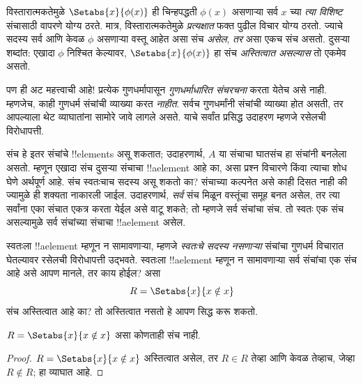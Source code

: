 \documentclass[../../../include/open-logic-section]{subfiles}
\begin{document}

विस्तारात्मकतेमुळे $\Setabs{x}{\phi(x)}$ ही चिन्हपद्धती $\phi(x)$ असणाऱ्या
सर्व $x$ च्या \emph{त्या विशिष्ट} संचासाठी वापरणे योग्य ठरते.
मात्र, विस्तारात्मकतेमुळे \emph{प्रत्यक्षात} फक्त पुढील विचार योग्य ठरतो.
ज्याचे सदस्य सर्व आणि केवळ $\phi$ असणाऱ्या वस्तू आहेत असा संच \emph{असेल},
\emph{तर} असा एकच संच असतो. दुसऱ्या शब्दांत: एखादा $\phi$ निश्चित केल्यावर,
$\Setabs{x}{\phi(x)}$ हा संच \emph{अस्तित्वात असल्यास} तो एकमेव असतो.

पण ही अट महत्त्वाची आहे!{} प्रत्येक गुणधर्मापासून \emph{गुणधर्माधारित संचरचना}
करता येतेच असे नाही. म्हणजेच, काही गुणधर्म संचांची व्याख्या करत \emph{नाहीत}.
सर्वच गुणधर्मांनी संचांची व्याख्या होत असती, तर आपल्याला थेट व्याघातांना
सामोरे जावे लागले असते. याचे सर्वांत प्रसिद्ध उदाहरण म्हणजे रसेलची विरोधापत्ती.

संच हे इतर संचांचे !!{element}s असू शकतात; उदाहरणार्थ, $A$ या संचाचा घातसंच
हा संचांनी बनलेला असतो. म्हणून एखादा संच दुसऱ्या संचाचा !!a{element} आहे का,
असा प्रश्न विचारणे किंवा त्याचा शोध घेणे अर्थपूर्ण आहे. संच स्वतःचाच सदस्य
असू शकतो का? संचाच्या कल्पनेत असे काही दिसत नाही की ज्यामुळे ही शक्यता
नाकारली जाईल. उदाहरणार्थ, \emph{सर्व} संच मिळून वस्तूंचा समूह बनत असेल,
तर त्या सर्वांना एका संचात एकत्र करता येईल असे वाटू शकते; तो म्हणजे सर्व
संचांचा संच. तो स्वतः एक संच असल्यामुळे सर्व संचांच्या संचाचा !!a{element} असेल.

स्वतःला !!a{element} म्हणून न सामावणाऱ्या, म्हणजे \emph{स्वतःचे सदस्य नसणाऱ्या}
संचांचा गुणधर्म विचारात घेतल्यावर रसेलची विरोधापत्ती उद्भवते.
स्वतःला !!a{element} म्हणून न सामावणाऱ्या सर्व संचांचा एक संच आहे असे आपण
मानले, तर काय होईल? असा
\[
R = \Setabs{x}{x \notin x}
\]
संच अस्तित्वात आहे का? तो अस्तित्वात नसतो हे आपण सिद्ध करू शकतो.

\begin{thm}[रसेलची विरोधापत्ती]
	$R = \Setabs{x}{x \notin x}$ असा कोणताही संच नाही.
\end{thm}

\begin{proof}
$R = \Setabs{x}{x \notin x}$ अस्तित्वात असेल, तर
$R \in R$ तेव्हा आणि केवळ तेव्हाच, जेव्हा $R \notin R$; हा व्याघात आहे.
\end{proof}
\end{document}
